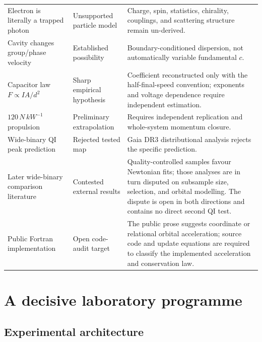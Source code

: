 \documentclass[11pt]{article}
\begin{document}
\begin{longtable}{>{\raggedright\arraybackslash}p{}>{\raggedright\arraybackslash}p{}>{\raggedright\arraybackslash}p{}}
Electron is literally a trapped photon & Unsupported particle model & Charge, spin, statistics, chirality, couplings, and scattering structure remain un-derived. \\
Cavity changes group/phase velocity & Established possibility & Boundary-conditioned dispersion, not automatically variable fundamental \(c\). \\
Capacitor law \(F\propto IA/d^2\) & Sharp empirical hypothesis & Coefficient reconstructed only with the half-final-speed convention; exponents and voltage dependence require independent estimation. \\
\(120\,\si{N\,kW^{-1}}\) propulsion & Preliminary extrapolation & Requires independent replication and whole-system momentum closure. \\
Wide-binary QI peak prediction & Rejected tested map & Gaia DR3 distributional analysis rejects the specific prediction. \\
Later wide-binary comparison literature & Contested external results & Quality-controlled samples favour Newtonian fits; those analyses are in turn disputed on subsample size, selection, and orbital modelling. The dispute is open in both directions and contains no direct second QI test. \\
Public Fortran implementation & Open code-audit target & The public prose suggests coordinate or relational orbital acceleration; source code and update equations are required to classify the implemented acceleration and conservation law. \\
\bottomrule
\end{longtable}

\section{A decisive laboratory programme}
\label{sec:lab_programme}

\subsection{Experimental architecture}
\end{document}
